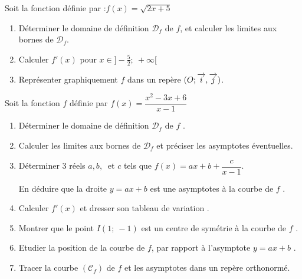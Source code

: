 \begin{exercice}
Soit la fonction d\'efinie par :$f(x)=\sqrt{2x+5}$
\begin{enumerate}
 \item D\'eterminer le domaine de d\'efinition $\mathscr{D}_f$ de $f$, et calculer les limites aux bornes de 
 $\mathscr{D}_f$. 
 \item Calculer $f'(x)$ pour $x\in \big]-\frac{5}{2};~+\infty\big[$
 \item Repr\'esenter graphiquement $f$ dans un rep\`ere $(O ;\overrightarrow{i},\overrightarrow{j})$.
\end{enumerate}
\end{exercice}
\begin{exercice}
 Soit la fonction $f$ d\'efinie par $f(x)=\dfrac{x^2-3x+6}{x-1}$
\begin{enumerate}
 \item Déterminer le domaine de d\'efinition $\mathscr{D}_f$ de $f$ .
 \item Calculer les limites aux bornes de $\mathscr{D}_f$ et pr\'eciser les asymptotes \'eventuelles. 
 \item Déterminer 3 r\'eels $a,b,~$ et $c$ tels que $f(x)=ax+b+\dfrac{c}{x-1}$. 
 
 En d\'eduire que la droite 
 $y=ax+b$ est une asymptotes \`a la courbe de $f$ .
 \item Calculer $f'(x)$ et dresser son tableau de variation .
 \item Montrer que le point $I(1;~-1)$ est un centre de sym\'etrie \`a la courbe de $f$ .
 \item Etudier la position de la courbe de $f$, par rapport \`a l'asymptote $y=ax+b$ .
 \item Tracer la courbe $(\mathscr{C}_f)$ de $f$ et les asymptotes dans un rep\`ere orthonorm\'e. 
\end{enumerate}
\end{exercice}

